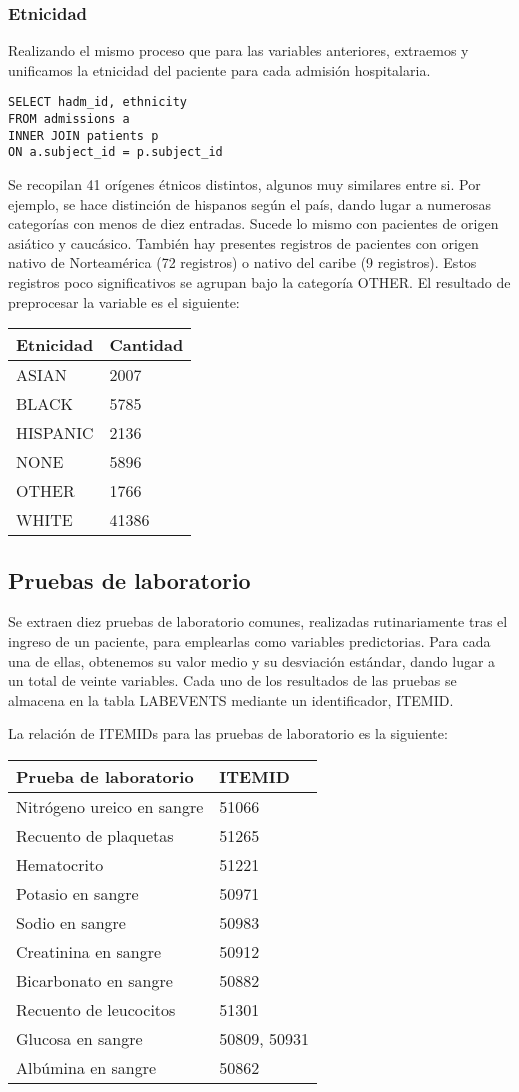 \documentclass{report}
\begin{document}
\subsubsection{Etnicidad}

Realizando el mismo proceso que para las variables anteriores, extraemos
y unificamos la etnicidad del paciente para cada admisión hospitalaria.
\begin{verbatim}
SELECT hadm_id, ethnicity
FROM admissions a
INNER JOIN patients p
ON a.subject_id = p.subject_id
\end{verbatim}

Se recopilan 41 orígenes étnicos distintos, algunos muy similares entre si. Por ejemplo, se hace distinción de hispanos según el país, dando lugar a numerosas categorías con menos de diez entradas. Sucede lo mismo con pacientes de origen asiático y caucásico. También hay presentes registros de pacientes con origen nativo de Norteamérica (72 registros) o nativo del caribe (9 registros). Estos registros poco significativos se agrupan bajo la categoría OTHER. El resultado de preprocesar la variable es el siguiente:

\begin{longtable}[]{@{}ll@{}}
\toprule
Etnicidad & Cantidad\tabularnewline
\midrule
\endhead
ASIAN & 2007\tabularnewline
BLACK & 5785\tabularnewline
HISPANIC & 2136\tabularnewline
NONE & 5896\tabularnewline
OTHER & 1766\tabularnewline
WHITE & 41386\tabularnewline
\bottomrule
\end{longtable}

\subsection{Pruebas de laboratorio}

Se extraen diez pruebas de laboratorio comunes, realizadas
rutinariamente tras el ingreso de un paciente, para emplearlas como
variables predictorias. Para cada una de ellas, obtenemos su valor medio y su desviación
estándar, dando lugar a un total de veinte variables. Cada uno de los resultados de las pruebas se almacena en la tabla
LABEVENTS mediante un identificador, ITEMID.

La relación de ITEMIDs para las pruebas de laboratorio es la siguiente:

\begin{longtable}[]{@{}ll@{}}
\toprule
Prueba de laboratorio & ITEMID\tabularnewline
\midrule
\endhead
Nitrógeno ureico en sangre & 51066\tabularnewline
Recuento de plaquetas & 51265\tabularnewline
Hematocrito & 51221\tabularnewline
Potasio en sangre & 50971\tabularnewline
Sodio en sangre & 50983\tabularnewline
Creatinina en sangre & 50912\tabularnewline
Bicarbonato en sangre & 50882\tabularnewline
Recuento de leucocitos & 51301\tabularnewline
Glucosa en sangre & 50809, 50931\tabularnewline
Albúmina en sangre & 50862\tabularnewline
\bottomrule
\end{longtable}
\end{document}
